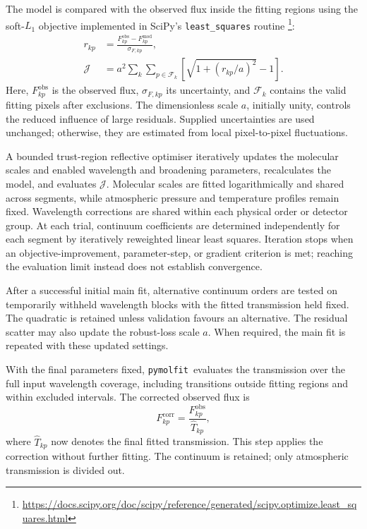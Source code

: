 \documentclass{aa}
\newcommand{\pymolfit}{\texttt{pymolfit}}
\begin{document}
The model is compared with the observed flux inside the fitting regions using the soft-\(L_1\) objective implemented in SciPy's \texttt{least\_squares} routine \citep{SCIPY}\footnote{\url{https://docs.scipy.org/doc/scipy/reference/generated/scipy.optimize.least_squares.html}}:
\begin{equation}
    \begin{aligned}
        r_{kp}
        &= \frac{F^{\mathrm{obs}}_{kp}-F^{\mathrm{mod}}_{kp}}
                 {\sigma_{F,kp}}, \\
        \mathcal{J}
        &= a^2 \sum_k \sum_{p\in\mathcal F_k}
        \left[\sqrt{1+\left(r_{kp}/a\right)^2}-1\right].
    \end{aligned}
\end{equation}
Here, \(F^{\mathrm{obs}}_{kp}\) is the observed flux, \(\sigma_{F,kp}\) its uncertainty, and \(\mathcal F_k\) contains the valid fitting pixels after exclusions. The dimensionless scale \(a\), initially unity, controls the reduced influence of large residuals. Supplied uncertainties are used unchanged; otherwise, they are estimated from local pixel-to-pixel fluctuations.

A bounded trust-region reflective optimiser iteratively updates the molecular scales and enabled wavelength and broadening parameters, recalculates the model, and evaluates \(\mathcal{J}\). Molecular scales are fitted logarithmically and shared across segments, while atmospheric pressure and temperature profiles remain fixed. Wavelength corrections are shared within each physical order or detector group. At each trial, continuum coefficients are determined independently for each segment by iteratively reweighted linear least squares. Iteration stops when an objective-improvement, parameter-step, or gradient criterion is met; reaching the evaluation limit instead does not establish convergence.

After a successful initial main fit, alternative continuum orders are tested on temporarily withheld wavelength blocks with the fitted transmission held fixed. The quadratic is retained unless validation favours an alternative. The residual scatter may also update the robust-loss scale \(a\). When required, the main fit is repeated with these updated settings.

With the final parameters fixed, \pymolfit\ evaluates the transmission over the full input wavelength coverage, including transitions outside fitting regions and within excluded intervals. The corrected observed flux is
\begin{equation}
    F^{\mathrm{corr}}_{kp}
    = \frac{F^{\mathrm{obs}}_{kp}}{\widehat T_{kp}},
\end{equation}
where \(\widehat T_{kp}\) now denotes the final fitted transmission. This step applies the correction without further fitting. The continuum is retained; only atmospheric transmission is divided out.
\end{document}

